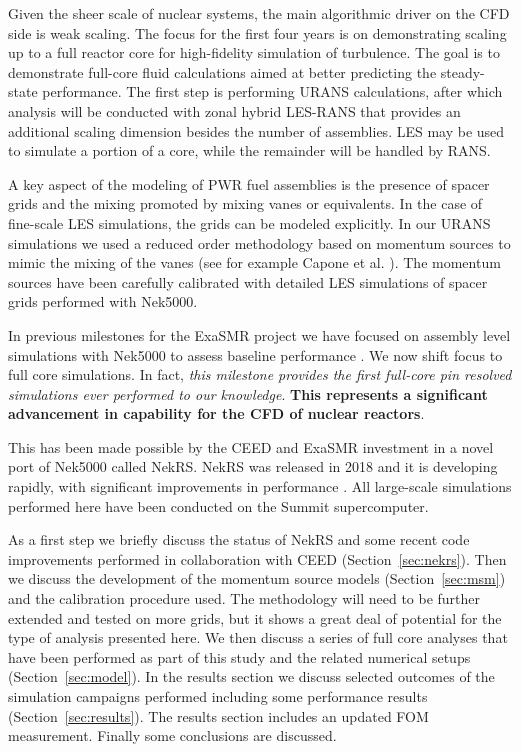\documentclass{ecpreportv2}
\begin{document}
Given the sheer scale of nuclear systems, the main algorithmic driver on the CFD side is weak scaling.
The focus for the first four years is  on demonstrating scaling up to a full reactor core for high-fidelity simulation of turbulence. The goal is to demonstrate full-core fluid calculations aimed at better predicting the steady-state performance. The first step is performing URANS calculations, after which analysis will be conducted with zonal hybrid LES-RANS that provides an additional scaling dimension besides the number of assemblies. LES may be used to simulate a portion of a core, while the remainder will be handled by RANS.

A key aspect of the modeling of PWR fuel assemblies is the presence of spacer grids and the mixing promoted by mixing vanes or equivalents. In the case of fine-scale LES simulations, the grids can be modeled explicitly. In our URANS simulations we used a reduced order methodology based on momentum sources to mimic the mixing of the vanes (see for example Capone et al. \cite{Capone2016}). The momentum sources have been carefully calibrated with detailed LES simulations of spacer grids performed with Nek5000.

In previous milestones for the ExaSMR project we have focused on assembly level simulations with Nek5000 to assess baseline performance \cite{merzari2018performance} \cite{merzari2020wall}. We now shift focus to full core simulations. In fact, \textit{this milestone provides the first full-core pin resolved simulations ever performed to our knowledge}. \textbf{This represents a significant advancement in capability for the CFD of nuclear reactors}.

This has been made possible by the CEED and ExaSMR investment in a novel port of Nek5000 called NekRS. NekRS was released in 2018 and it is developing rapidly, with significant improvements in performance \cite{merzari2020toward}. All large-scale simulations performed here have been conducted on the Summit supercomputer.

As a first step we briefly discuss the status of NekRS and some recent code improvements performed in collaboration with CEED (Section~\ref{sec:nekrs}).   Then we discuss the development of the momentum source models (Section~\ref{sec:msm}) and the calibration procedure used. The methodology will need to be further extended and tested on more grids, but it shows a great deal of potential for the type of analysis presented here. We then discuss a series of full core analyses that have been performed as part of this study and the related numerical setups (Section~\ref{sec:model}). In the results section we discuss selected outcomes of the simulation campaigns performed including some performance results (Section~\ref{sec:results}). The results section includes an updated FOM measurement. Finally some conclusions are discussed.
\end{document}
